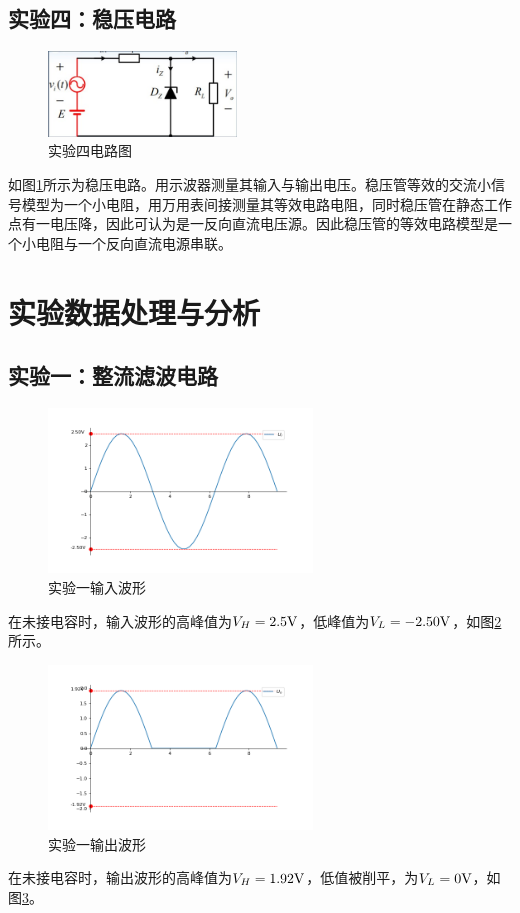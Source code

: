 \documentclass[a4paper,11pt,UTF8]{ctexart}
\begin{document}
	\subsection{实验四：稳压电路}
	\begin{figure}[H]
		\centering
		\includegraphics[width=5cm]{exp10.png}
		\caption{实验四电路图}
		\label{fig:Exp4}
	\end{figure}
	如图\ref{fig:Exp4}所示为稳压电路。用示波器测量其输入与输出电压。稳压管等效的交流小信号模型为一个小电阻，用万用表间接测量其等效电路电阻，同时稳压管在静态工作点有一电压降，因此可认为是一反向直流电压源。因此稳压管的等效电路模型是一个小电阻与一个反向直流电源串联。
	
	\section{实验数据处理与分析}
	
	\subsection{实验一：整流滤波电路}
	\begin{figure}[H]
		\centering
		\includegraphics[width=7cm]{Ui.png}
		\caption{实验一输入波形}
		\label{fig:Exp1i}
	\end{figure}
	在未接电容时，输入波形的高峰值为$V_H=2.5\mathrm{V}$，低峰值为$V_L=-2.50\mathrm{V}$，如图\ref{fig:Exp1i}所示。
	\begin{figure}[H]
		\centering
		\includegraphics[width=7cm]{U1.png}
		\caption{实验一输出波形}
		\label{fig:Exp1o}
	\end{figure}
	在未接电容时，输出波形的高峰值为$V_H=1.92\mathrm{V}$，低值被削平，为$V_L=0\mathrm{V}$，如图\ref{fig:Exp1o}。
	
\end{document}
